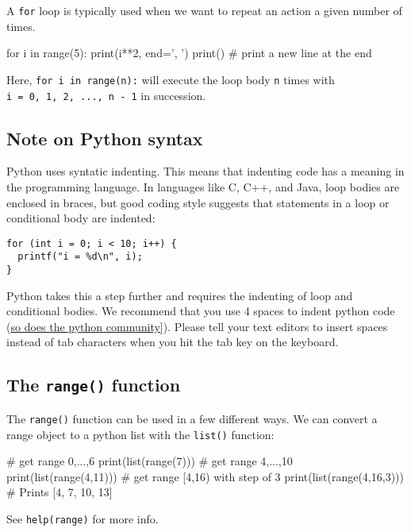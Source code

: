 \documentclass[12pt]{article} \newif\ifsolution\solutiontrue %
\begin{document}
A \texttt{for} loop is typically used when we want to repeat an action a
given number of times.

\begin{python}
for i in range(5):
    print(i**2, end=', ')
print() # print a new line at the end
\end{python}

Here, \texttt{for\ i\ in\ range(n):} will execute the loop body
\texttt{n} times with \texttt{i\ =\ 0,\ 1,\ 2,\ ...,\ n\ -\ 1} in
succession.

\subsection{Note on Python syntax}\label{note-on-python-syntax}

Python uses syntatic indenting. This means that indenting code has a
meaning in the programming language. In languages like C, C++, and Java,
loop bodies are enclosed in braces, but good coding style suggests that
statements in a loop or conditional body are indented:

\begin{verbatim}
for (int i = 0; i < 10; i++) {     
  printf("i = %d\n", i);
}
\end{verbatim}

Python takes this a step further and requires the indenting of loop and
conditional bodies. We recommend that you use 4 spaces to indent python
code
(\href{https://www.python.org/dev/peps/pep-0008/\#tabs-or-spaces}{so
does the python community}{]}). Please tell your text editors to insert
spaces instead of tab characters when you hit the tab key on the
keyboard.

\subsection{\texorpdfstring{The \texttt{range()}
function}{The range() function}}\label{the-range-function}

The \texttt{range()} function can be used in a few different ways. We
can convert a range object to a python list with the \texttt{list()}
function:

\begin{python}
# get range 0,...,6
print(list(range(7)))
# get range 4,...,10
print(list(range(4,11)))
# get range [4,16) with step of 3
print(list(range(4,16,3)))                    # Prints [4, 7, 10, 13]
\end{python}

See \texttt{help(range)} for more info.
\end{document}
